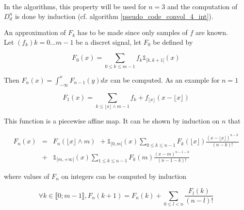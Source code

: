 In the algorithms, this property will be used for $n=3$ and the computation of $D_d^n$ is done by induction (cf. algorithm \ref{pseudo_code_convol_4_int}).

An approximation of $F_{k}$ has to be made since only samples of $f$ are known.\\
Let $(f_k){k=0...m-1}$ be a discret signal, let $F_0$ be defined by

\begin{equation*}
F_{0} (x) =\underset{0\le k \le m-1}{\sum}f_{k} \mathds{1}_{[k,k+1[}(x)
\end{equation*}

Then $F_{n}(x)=\int_{-\infty}^{x}F_{n-1}(y)dx$ can be computed. As an example for $n=1$

\begin{equation*}
F_{1}(x)=\underset{k\le \lfloor x\rfloor \wedge m-1}{\sum}f_{k}+ f_{\lfloor x\rfloor}
(x-\lfloor x\rfloor)
\end{equation*}

This function is a piecewise affine map. It can be shown by induction on $n$ that

\begin{eqnarray*}
F_{n}(x) &=& F_{n}(\lfloor x\rfloor \wedge m)~~+\mathds{1}_{[0,m[}(x) \underset{0\le k \le n-1}{\sum}F_{k}(\lfloor x \rfloor) \frac{(x-\lfloor x \rfloor)^{n-k}}{(n-k)!}\\
          &+&\mathds{1}_{[m,+\infty[}(x)\underset{1\le k \le n-1}{\sum}F_{k}(m) \frac{(x-m)^{n-1-k}}{(n-1-k)!}
\end{eqnarray*}

where values of $F_n$ on integers can be computed by induction

\begin{equation*}
\forall k \in \llbracket 0 ; m-1 \rrbracket, F_{n}(k+1)=F_{n}(k)+\underset{0\le l < n}{\sum} \frac{F_{l}(k)}{(n-l)!}
\end{equation*}






